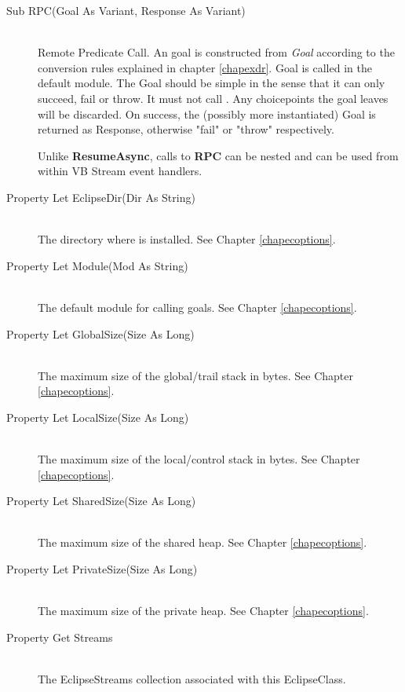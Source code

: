 \begin{description}
\item[Sub RPC(Goal As Variant, Response As Variant)]\ \\
        {\eclipse} Remote Predicate Call.
	An {\eclipse} goal is constructed from {\it Goal}
	according to the conversion rules explained in chapter \ref{chapexdr}.
	Goal is called in the default module.  The Goal should be
	simple in the sense that it can only succeed, fail or throw.
	It must not call
	.  Any
	choicepoints the goal leaves will be discarded.  On success,
	the (possibly more instantiated) Goal is returned as Response,
	otherwise "fail" or "throw" respectively.

	Unlike {\bf ResumeAsync}, calls to {\bf RPC} can be nested
	and can be used from within VB Stream event handlers.

\item[Property Let EclipseDir(Dir As String)]\ \\
	The directory where {\eclipse} is installed.
	See Chapter \ref{chapecoptions}.

\item[Property Let Module(Mod As String)]\ \\
	The default module for calling goals.
	See Chapter \ref{chapecoptions}.

\item[Property Let GlobalSize(Size As Long)]\ \\
	The maximum size of the {\eclipse} global/trail stack in bytes.
	See Chapter \ref{chapecoptions}.

\item[Property Let LocalSize(Size As Long)]\ \\
	The maximum size of the {\eclipse} local/control stack in bytes.
	See Chapter \ref{chapecoptions}.

\item[Property Let SharedSize(Size As Long)]\ \\
	The maximum size of the {\eclipse} shared heap.
	See Chapter \ref{chapecoptions}.

\item[Property Let PrivateSize(Size As Long)]\ \\
	The maximum size of the {\eclipse} private heap.
	See Chapter \ref{chapecoptions}.

\item[Property Get Streams]\ \\
	The EclipseStreams collection associated with this EclipseClass.
\end{description}


